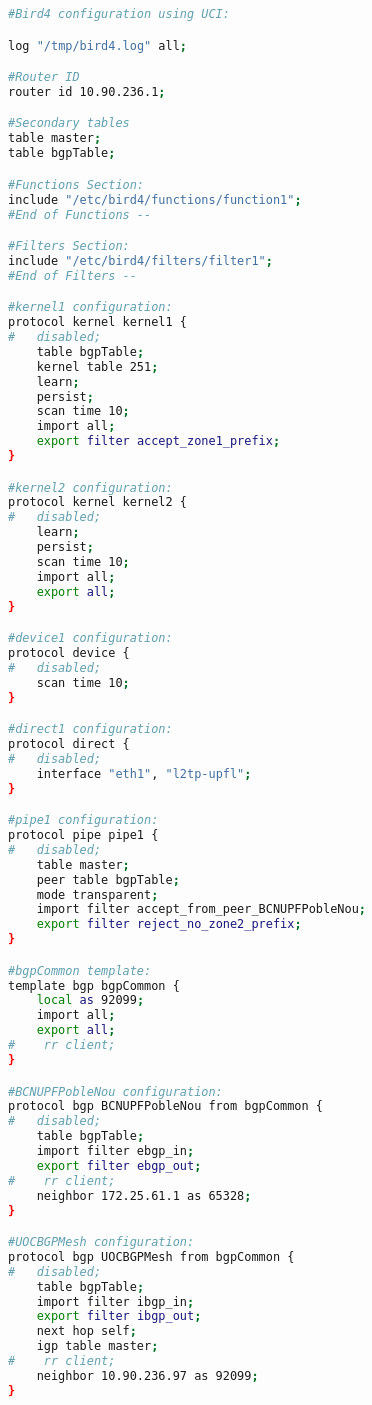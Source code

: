 \begin{lstlisting}[language=bash, caption={Bird RAW Configuration}]
#Bird4 configuration using UCI:

log "/tmp/bird4.log" all;

#Router ID
router id 10.90.236.1;

#Secondary tables
table master;
table bgpTable;

#Functions Section:
include "/etc/bird4/functions/function1";
#End of Functions --

#Filters Section:
include "/etc/bird4/filters/filter1";
#End of Filters --

#kernel1 configuration:
protocol kernel kernel1 {
#   disabled;
    table bgpTable;
    kernel table 251;
    learn;
    persist;
    scan time 10;
    import all;
    export filter accept_zone1_prefix;
}

#kernel2 configuration:
protocol kernel kernel2 {
#   disabled;
    learn;
    persist;
    scan time 10;
    import all;
    export all;
}

#device1 configuration:
protocol device {
#   disabled;
    scan time 10;
}

#direct1 configuration:
protocol direct {
#   disabled;
    interface "eth1", "l2tp-upfl";
}

#pipe1 configuration:
protocol pipe pipe1 {
#   disabled;
    table master;
    peer table bgpTable;
    mode transparent;
    import filter accept_from_peer_BCNUPFPobleNou;
    export filter reject_no_zone2_prefix;
}

#bgpCommon template:
template bgp bgpCommon {
    local as 92099;
    import all;
    export all;
#    rr client;
}

#BCNUPFPobleNou configuration:
protocol bgp BCNUPFPobleNou from bgpCommon {
#   disabled;
    table bgpTable;
    import filter ebgp_in;
    export filter ebgp_out;
#    rr client;
    neighbor 172.25.61.1 as 65328;
}

#UOCBGPMesh configuration:
protocol bgp UOCBGPMesh from bgpCommon {
#   disabled;
    table bgpTable;
    import filter ibgp_in;
    export filter ibgp_out;
    next hop self;
    igp table master;
#    rr client;
    neighbor 10.90.236.97 as 92099;
}
\end{lstlisting}